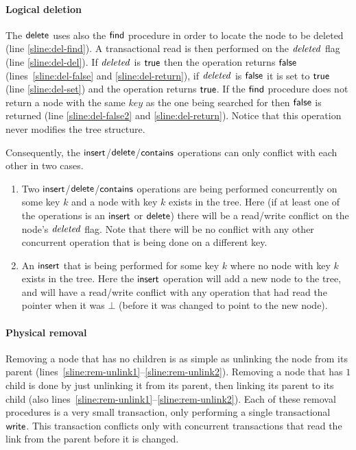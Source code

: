 \paragraph{Logical deletion} The $\act{delete}$ uses also the $\act{find}$ procedure in order to locate the node to be deleted (line \ref{sline:del-find}).
A transactional read is then performed on the $\ms{deleted}$ flag (line \ref{sline:del-del}).
If $\ms{deleted}$ is $\lit{true}$ then the operation returns $\lit{false}$ (lines~\ref{sline:del-false} and \ref{sline:del-return}), if $\ms{deleted}$
is $\lit{false}$ it is set to $\lit{true}$ (line \ref{sline:del-set}) and the operation returns $\lit{true}$.
If the $\act{find}$ procedure does not return a node with the same $key$ as the one being searched for then $\lit{false}$ is returned (line \ref{sline:del-false2} and \ref{sline:del-return}).
Notice that this operation never modifies the tree structure.

Consequently, the $\act{insert}$/$\act{delete}$/$\act{contains}$ operations can only conflict with each other in two cases.
\begin{enumerate}
  \item Two $\act{insert}$/$\act{delete}$/$\act{contains}$ operations are being performed concurrently on some key $k$ and a node with key $k$ exists in the tree.
	Here (if at least one of the operations is an $\act{insert}$ or $\act{delete}$) there will be a read/write conflict on the node's $\ms{deleted}$ flag.
	Note that there will be no conflict with any other concurrent operation that is being done on a different key.
  \item An $\act{insert}$ that is being performed for some key $k$ where no node with key $k$ exists in the tree.
	Here the $\act{insert}$ operation will add a new node to the tree, and will have a read/write conflict with any operation that had read
	the pointer when it was $\bot$ (before it was changed to point to the new node).
\end{enumerate}



\paragraph{Physical removal}
Removing a node that has no children is as simple as unlinking the node from its parent (lines~\ref{sline:rem-unlink1}--\ref{sline:rem-unlink2}).
Removing a node that has $1$ child is done by just unlinking it from its parent, then linking its parent to its child (also lines~\ref{sline:rem-unlink1}--\ref{sline:rem-unlink2}).
Each of these removal procedures is a very small transaction, only performing a single transactional $\act{write}$.
This transaction conflicts only with concurrent transactions that read the link from the parent before it is changed.

